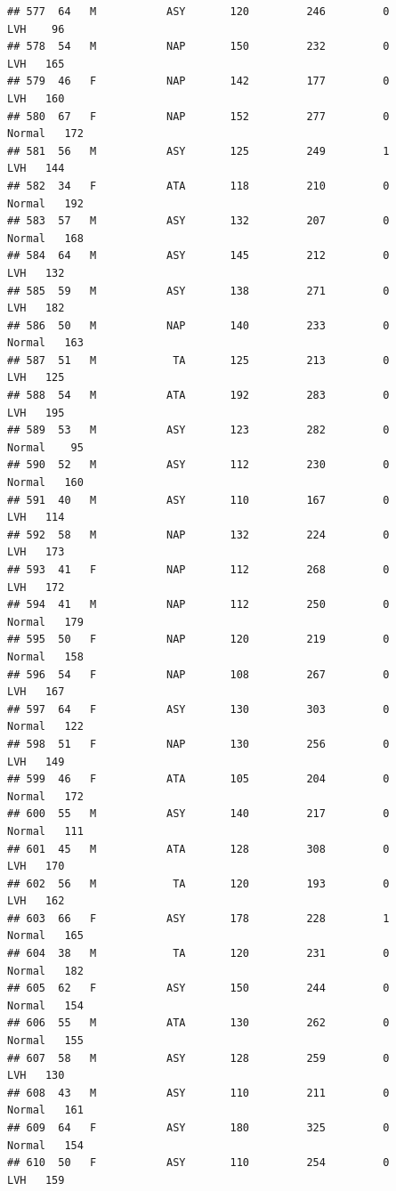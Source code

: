 \documentclass[
]{article}
\begin{document}
\begin{verbatim}
## 577  64   M           ASY       120         246         0        LVH    96
## 578  54   M           NAP       150         232         0        LVH   165
## 579  46   F           NAP       142         177         0        LVH   160
## 580  67   F           NAP       152         277         0     Normal   172
## 581  56   M           ASY       125         249         1        LVH   144
## 582  34   F           ATA       118         210         0     Normal   192
## 583  57   M           ASY       132         207         0     Normal   168
## 584  64   M           ASY       145         212         0        LVH   132
## 585  59   M           ASY       138         271         0        LVH   182
## 586  50   M           NAP       140         233         0     Normal   163
## 587  51   M            TA       125         213         0        LVH   125
## 588  54   M           ATA       192         283         0        LVH   195
## 589  53   M           ASY       123         282         0     Normal    95
## 590  52   M           ASY       112         230         0     Normal   160
## 591  40   M           ASY       110         167         0        LVH   114
## 592  58   M           NAP       132         224         0        LVH   173
## 593  41   F           NAP       112         268         0        LVH   172
## 594  41   M           NAP       112         250         0     Normal   179
## 595  50   F           NAP       120         219         0     Normal   158
## 596  54   F           NAP       108         267         0        LVH   167
## 597  64   F           ASY       130         303         0     Normal   122
## 598  51   F           NAP       130         256         0        LVH   149
## 599  46   F           ATA       105         204         0     Normal   172
## 600  55   M           ASY       140         217         0     Normal   111
## 601  45   M           ATA       128         308         0        LVH   170
## 602  56   M            TA       120         193         0        LVH   162
## 603  66   F           ASY       178         228         1     Normal   165
## 604  38   M            TA       120         231         0     Normal   182
## 605  62   F           ASY       150         244         0     Normal   154
## 606  55   M           ATA       130         262         0     Normal   155
## 607  58   M           ASY       128         259         0        LVH   130
## 608  43   M           ASY       110         211         0     Normal   161
## 609  64   F           ASY       180         325         0     Normal   154
## 610  50   F           ASY       110         254         0        LVH   159

\end{verbatim}
\end{document}
